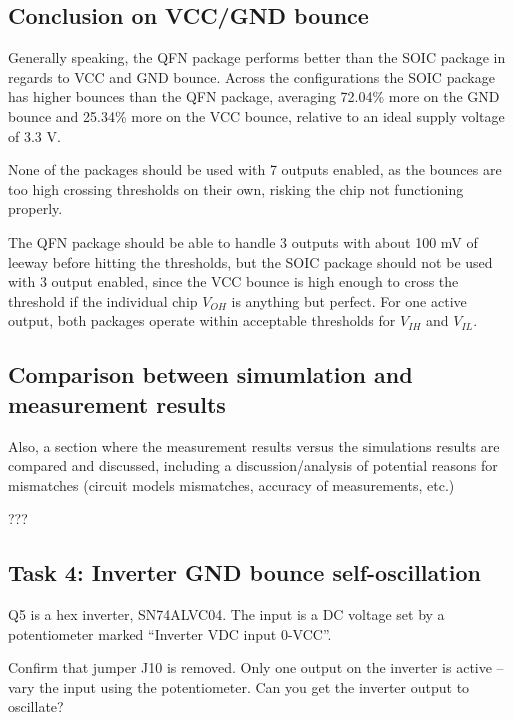 \documentclass[../main.tex]{subfiles}
\begin{document}
\vspace{10pt}


\subsection{Conclusion on VCC/GND bounce}

\solution

Generally speaking, the QFN package performs better than the SOIC package in regards to VCC and GND bounce. Across the configurations the SOIC package has higher bounces than the QFN package, averaging 72.04\% more on the GND bounce and 25.34\% more on the VCC bounce, relative to an ideal supply voltage of 3.3 V. 

None of the packages should be used with 7 outputs enabled, as the bounces are too high crossing thresholds on their own, risking the chip not functioning properly. 

The QFN package should be able to handle 3 outputs with about 100 mV of leeway before hitting the thresholds, but the SOIC package should not be used with 3 output enabled, since the VCC bounce is high enough to cross the threshold if the individual chip $V_{OH}$ is anything but perfect. For one active output, both packages operate within acceptable thresholds for $V_{IH}$ and $V_{IL}$. 


\subsection{Comparison between simumlation and measurement results}

Also, a section where the measurement results versus the simulations results are compared and discussed, including a discussion/analysis of potential reasons for mismatches (circuit models mismatches, accuracy of measurements, etc.)
\solution

???

\subsection{Task 4: Inverter GND bounce self-oscillation}

Q5 is a hex inverter, SN74ALVC04. The input is a DC voltage set by a potentiometer marked “Inverter VDC input 0-VCC”.

\vspace{10pt}

Confirm that jumper J10 is removed. Only one output on the inverter is active – vary the input using the potentiometer. Can you get the inverter output to oscillate?
\end{document}
